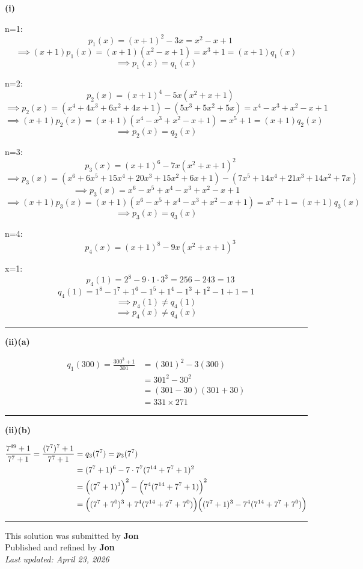 ﻿\documentclass[12pt]{article}
\begin{document}
\textbf{(i)}

 n=1:
$$\quad p_1(x)=(x+1)^2-3x=x^2-x+1$$
$$\implies (x+1)p_1(x)=(x+1)(x^2-x+1)=x^3+1=(x+1)q_1(x)$$
$$\implies p_1(x)=q_1(x)$$

\bigskip
{} n=2:
$$\quad p_2(x)=(x+1)^4-5x(x^2+x+1)$$
$$\implies p_2(x)=(x^4+4x^3+6x^2+4x+1)-(5x^3+5x^2+5x)=x^4-x^3+x^2-x+1$$
$$\implies (x+1)p_2(x)=(x+1)(x^4-x^3+x^2-x+1)=x^5+1=(x+1)q_2(x)$$
$$\implies p_2(x)=q_2(x)$$

\bigskip
{} n=3:
$$\quad p_3(x)=(x+1)^6-7x(x^2+x+1)^2$$
$$\implies p_3(x)=(x^6+6x^5+15x^4+20x^3+15x^2+6x+1)-(7x^5+14x^4+21x^3+14x^2+7x)$$
$$\implies p_3(x)=x^6-x^5+x^4-x^3+x^2-x+1$$
$$\implies (x+1)p_3(x)=(x+1)(x^6-x^5+x^4-x^3+x^2-x+1)=x^7+1=(x+1)q_3(x)$$
$$\implies p_3(x)=q_3(x)$$

\bigskip
{} n=4:
$$\quad p_4(x)=(x+1)^8-9x(x^2+x+1)^3$$

 x=1:
$$\quad p_4(1)=2^8-9\cdot1\cdot3^3=256-243=13$$
$$q_4(1)=1^8-1^7+1^6-1^5+1^4-1^3+1^2-1+1=1$$
$$\implies p_4(1)\ne q_4(1)$$
$$\implies p_4(x)\ne q_4(x)$$


\bigskip\hrule\bigskip
\textbf{(ii)(a)} 

\[
\begin{aligned}
q_1(300)=\frac{300^3+1}{301}&=(301)^2-3(300)\\
&=301^2-30^2\\
&=(301-30)(301+30)\\
&=331\times 271
\end{aligned}
\]

\bigskip\hrule\bigskip
\textbf{(ii)(b)}

\[
\begin{aligned}
\dfrac{7^{49}+1}{7^7+1}=\dfrac{(7^7)^7+1}{7^7+1}&=q_3(7^7)=p_3(7^7)\\
&=(7^7+1)^6-7\cdot7^7(7^{14}+7^7+1)^2\\
&=\Bigl((7^7+1)^3\Bigr)^2-\Bigl(7^4(7^{14}+7^7+1)\Bigr)^2\\
&=\Bigl((7^7+7^0)^3+7^4(7^{14}+7^7+7^0)\Bigr)\Bigl((7^7+1)^3-7^4(7^{14}+7^7+7^0)\Bigr)
\end{aligned}
\]

\bigskip
\hrule

\begin{center}
    This solution was submitted by \textbf{Jon}\\[4pt]
    Published and refined by \textbf{Jon}\\[8pt]
    \textit{Last updated: April 23, 2026}
\end{center}
\end{document}
